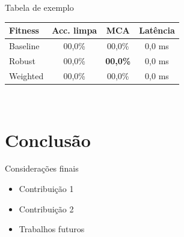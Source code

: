 \documentclass{UFAL-beamer-moderno}
\begin{document}
\begin{frame}{Tabela de exemplo}
  \centering
  \begin{tabular}{lccc}
    \toprule
    \textbf{Fitness} & \textbf{Acc. limpa} & \textbf{MCA} & \textbf{Latência} \\
    \midrule
    Baseline     & 00,0\% & 00,0\% & 0,0 ms \\
    Robust       & 00,0\% & \textcolor{ufalBlue}{\textbf{00,0\%}} & 0,0 ms \\
    Weighted     & 00,0\% & 00,0\% & 0,0 ms \\
    \bottomrule
  \end{tabular}\\[6pt]
\end{frame}

\section{Conclusão}

\begin{frame}{Considerações finais}
  \begin{itemize}
    \setlength{\itemsep}{8pt}
    \item Contribuição 1
    \item Contribuição 2
    \item Trabalhos futuros
  \end{itemize}
\end{frame}
\end{document}
